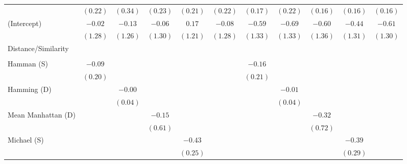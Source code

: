 \documentclass[
]{article}
\begin{document}
\begin{landscape}
\begin{table}
\begin{center}
\begin{tabular}{l c c c c c c c c c c }
                           & $(0.22)$    & $(0.34)$   & $(0.23)$    & $(0.21)$     & $(0.22)$    & $(0.17)$    & $(0.22)$    & $(0.16)$    & $(0.16)$    & $(0.16)$    \\
(Intercept)                & $-0.02$     & $-0.13$    & $-0.06$     & $0.17$       & $-0.08$     & $-0.59$     & $-0.69$     & $-0.60$     & $-0.44$     & $-0.61$     \\
                           & $(1.28)$    & $(1.26)$   & $(1.30)$    & $(1.21)$     & $(1.28)$    & $(1.33)$    & $(1.33)$    & $(1.36)$    & $(1.31)$    & $(1.30)$    \\
Distance/Similarity        &             &            &             &              &             &             &             &             &             &             \\
                           &             &            &             &              &             &             &             &             &             &             \\
\quad Hamman (S)           & $-0.09$     &            &             &              &             & $-0.16$     &             &             &             &             \\
                           & $(0.20)$    &            &             &              &             & $(0.21)$    &             &             &             &             \\
\quad Hamming (D)          &             & $-0.00$    &             &              &             &             & $-0.01$     &             &             &             \\
                           &             & $(0.04)$   &             &              &             &             & $(0.04)$    &             &             &             \\
\quad Mean Manhattan (D)   &             &            & $-0.15$     &              &             &             &             & $-0.32$     &             &             \\
                           &             &            & $(0.61)$    &              &             &             &             & $(0.72)$    &             &             \\
\quad Michael (S)          &             &            &             & $-0.43$      &             &             &             &             & $-0.39$     &             \\
                           &             &            &             & $(0.25)$     &             &             &             &             & $(0.29)$    &             \\

\end{tabular}
\end{center}
\end{table}
\end{landscape}
\end{document}
